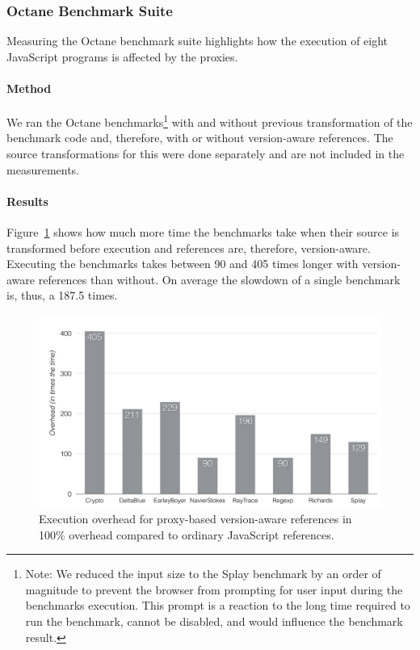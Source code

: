 \subsubsection{Octane Benchmark Suite}

Measuring the Octane benchmark suite highlights how the execution of eight JavaScript programs is affected by the proxies.

\paragraph{Method}
We ran the Octane benchmarks\footnote{Note: We reduced the input size to the Splay benchmark by an order of magnitude to prevent the browser from prompting for user input during the benchmarks execution. This prompt is a reaction to the long time required to run the benchmark, cannot be disabled, and would influence the benchmark result.} with and without previous transformation of the benchmark code and, therefore, with or without version-aware references.
The source transformations for this were done separately and are not included in the measurements.

\paragraph{Results}
Figure~\ref{fig:ExecutionOverhead} shows how much more time the benchmarks take when their source is transformed before execution and references are, therefore, version-aware.
Executing the benchmarks takes between 90 and 405 times longer with version-aware references than without.
On average the slowdown of a single benchmark is, thus, a 187.5 times.

\begin{figure}[h]
    \centering
    \includegraphics[width=\textwidth]{figures/6_evaluation/3_executionOverhead.pdf}
    \caption{Execution overhead for proxy-based version-aware references in 100\% overhead compared to ordinary JavaScript references.}
    \label{fig:ExecutionOverhead}
\end{figure}


